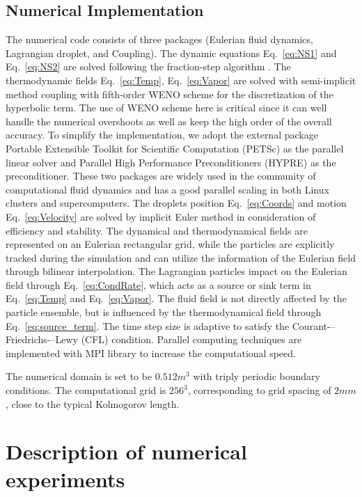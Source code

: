 \documentclass[draft,jgrga]{AGUTeX}
\newcommand{\Eq}[1]{Eq.~\eqref{#1}} \newcommand{\Fig}[1]{Figure~\ref{#1}}
\begin{document}
\begin{article}
\subsection{Numerical Implementation}
The numerical code consists of three packages (Eulerian fluid dynamics, Lagrangian droplet, and Coupling). The dynamic equations \Eq{eq:NS1} and \Eq{eq:NS2} are solved following the fraction-step algorithm \cite{Brown2001}. The thermodynamic fields \Eq{eq:Temp}, \Eq{eq:Vapor} are solved with semi-implicit method coupling with fifth-order WENO scheme for the discretization of the hyperbolic term. The use of WENO scheme here is critical since it can well handle the numerical overshoots as well as keep the high order of the overall accuracy. To simplify the implementation, we adopt the external package Portable Extensible Toolkit for Scientific Computation (PETSc) \cite{petsc_cite} as the parallel linear solver and Parallel High Performance Preconditioners (HYPRE) \cite{hypre_cite} as the preconditioner. These two packages are widely used in the community of computational fluid dynamics and has a good parallel scaling in both Linux clusters and supercomputers. The droplets position \Eq{eq:Coords} and motion \Eq{eq:Velocity} are solved by implicit Euler method in consideration of efficiency and stability. The dynamical and thermodynamical fields are represented on an Eulerian rectangular grid, while the particles are explicitly tracked during the simulation and can utilize the information of the Eulerian field through bilinear interpolation. The Lagrangian particles impact on the Eulerian field through \Eq{eq:CondRate}, which acts as a source or sink term in \Eq{eq:Temp} and \Eq{eq:Vapor}. The fluid field is not directly affected by the particle ensemble, but is influenced by the thermodynamical field through \Eq{eq:source_term}. The time step size is adaptive to satisfy the Courant-–Friedrichs-–Lewy (CFL) condition. Parallel computing techniques are implemented with MPI library to increase the computational speed.

The numerical domain is set to be $0.512m^{3}$ with triply periodic boundary conditions. The computational grid is $256^{3}$, corresponding to grid spacing of $2mm$, close to the typical Kolmogorov length.

\section{Description of numerical experiments}\label{experiment_description}


\end{article}
\end{document}

